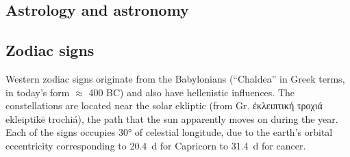 \documentclass[british,final,landscape]{scrartcl}
\begin{document}
\begin{refsection}
\section{Astrology and astronomy}

\subsection{Zodiac signs}

Western zodiac signs originate from the Babylonians (``Chaldea'' in Greek terms, in today's form \(\approx\) \num{400} BC) and also have hellenistic influences. The constellations are located near the solar ekliptic (from Gr. \foreignlanguage{greek}{ἐκλειπτική τροχιά} ekleiptikē trochiá), the path that the sun apparently moves on during the year. Each of the signs occupies \ang{30} of celestial longitude, due to the earth's orbital eccentricity corresponding to \SI{20.4}{d} for Capricorn to \SI{31.4}{d} for cancer.


\end{refsection}
\end{document}
